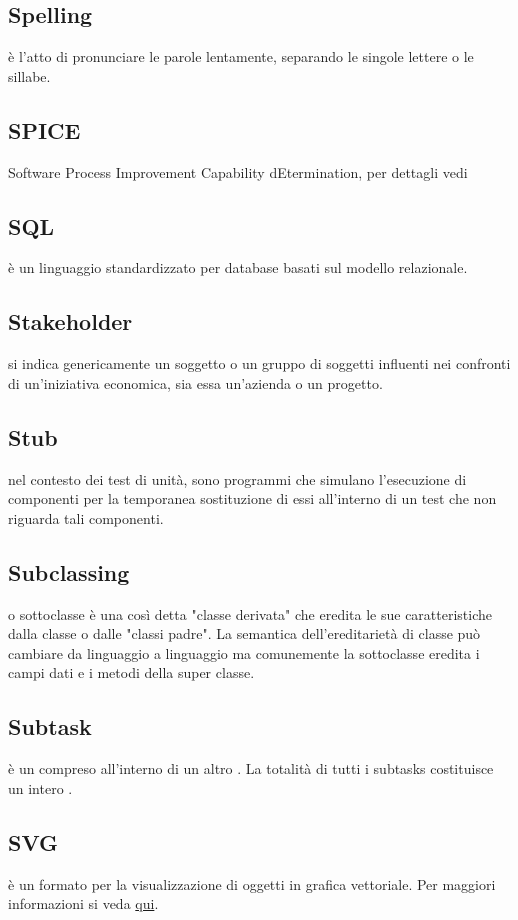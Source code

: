 \documentclass[12pt,a4paper]{article}
\begin{document}
\subsection{Spelling} 
è l'atto di pronunciare le parole lentamente, separando le singole lettere o le sillabe.

\subsection{SPICE} 
 Software Process Improvement Capability
dEtermination, per dettagli vedi \PdQ

\subsection{SQL} 
è un linguaggio standardizzato per database basati sul modello relazionale.

\subsection{Stakeholder} 
si indica genericamente un soggetto o un gruppo di soggetti influenti nei confronti di un'iniziativa economica, sia essa un'azienda o un progetto.

\subsection{Stub} 
nel contesto dei test di unità, sono programmi che simulano l'esecuzione di componenti  per la temporanea sostituzione di essi all'interno di un test  che non riguarda tali componenti.

\subsection{Subclassing} 
o sottoclasse è una così detta "classe derivata" che eredita le sue caratteristiche dalla classe o dalle "classi padre". La semantica dell'ereditarietà di classe può cambiare da linguaggio a linguaggio ma comunemente la sottoclasse eredita i campi dati e i metodi della super classe.

\subsection{Subtask} 
è un  compreso all'interno di un altro . La totalità di tutti i subtasks costituisce un intero .

\subsection{SVG} 
è un formato per la visualizzazione di oggetti in grafica vettoriale. Per maggiori informazioni si veda \href{https://it.wikipedia.org/wiki/Scalable_Vector_Graphics}{qui}.
\end{document}
